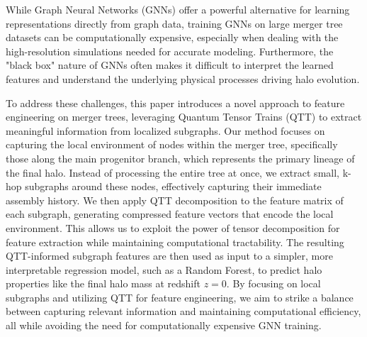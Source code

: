 \documentclass[twocolumn]{aastex631}
\begin{document}
While Graph Neural Networks (GNNs) offer a powerful alternative for learning representations directly from graph data, training GNNs on large merger tree datasets can be computationally expensive, especially when dealing with the high-resolution simulations needed for accurate modeling. Furthermore, the "black box" nature of GNNs often makes it difficult to interpret the learned features and understand the underlying physical processes driving halo evolution.

To address these challenges, this paper introduces a novel approach to feature engineering on merger trees, leveraging Quantum Tensor Trains (QTT) to extract meaningful information from localized subgraphs. Our method focuses on capturing the local environment of nodes within the merger tree, specifically those along the main progenitor branch, which represents the primary lineage of the final halo. Instead of processing the entire tree at once, we extract small, k-hop subgraphs around these nodes, effectively capturing their immediate assembly history. We then apply QTT decomposition to the feature matrix of each subgraph, generating compressed feature vectors that encode the local environment. This allows us to exploit the power of tensor decomposition for feature extraction while maintaining computational tractability. The resulting QTT-informed subgraph features are then used as input to a simpler, more interpretable regression model, such as a Random Forest, to predict halo properties like the final halo mass at redshift \(z=0\). By focusing on local subgraphs and utilizing QTT for feature engineering, we aim to strike a balance between capturing relevant information and maintaining computational efficiency, all while avoiding the need for computationally expensive GNN training.
\end{document}
